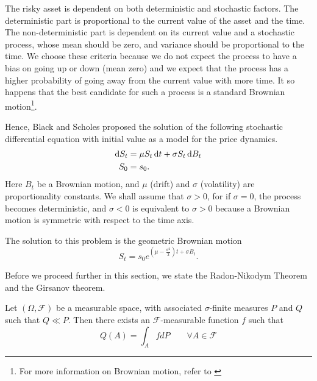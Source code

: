 The risky asset is dependent on both deterministic and stochastic factors. The deterministic part is proportional to the current value of the asset and the time. The non-deterministic part is dependent on its current value and a stochastic process, whose mean should be zero, and variance should be proportional to the time. We choose these criteria because we do not expect the process to have a bias on going up or down (mean zero) and we expect that the process has a higher probability of going away from the current value with more time. It so happens that the best candidate for such a process is a standard Brownian motion\footnote{For more information on Brownian motion, refer to \cite[Section 3.1]{Lamberton1996}}.

Hence, Black and Scholes proposed the solution of the following stochastic differential equation with initial value as a model for the price dynamics.
\begin{subequations}
	\label{eq:continous-risky-sde}
	\begin{align}
		\dif S_t  &=  \mu S_t \dif t + \sigma S_t \dif B_t \\
		S_0  &=  s_0 .
	\end{align}
\end{subequations}
Here $ B_t $ be a Brownian motion, and $ \mu $ (drift) and $ \sigma $ (volatility) are proportionality constants. We shall assume that $ \sigma > 0 $, for if $ \sigma = 0 $, the process becomes deterministic, and $ \sigma < 0 $ is equivalent to $ \sigma > 0 $ because a Brownian motion is symmetric with respect to the time axis.

The solution to this problem is the geometric Brownian motion
\begin{equation}
\label{eq:continous-risky-int}
S_t = s_0 e^{ ( \mu - \frac{\sigma^2}{2} )t + \sigma B_t }.
\end{equation}


Before we proceed further in this section, we state the Radon-Nikodym Theorem and the Girsanov theorem.

\begin{thm}
	\label{thm:radon-nikodym}
	Let $ (\Omega, \mathcal{F}) $ be a measurable space, with associated $ \sigma $-finite measures $ P $ and $ Q $ such that $ Q \ll P $. Then there exists an $ \mathcal{F} $-measurable function $ f $ such that
	\begin{equation*}
	Q(A) = \int_{A} f dP  \qquad  \forall A \in \mathcal{F}
	\end{equation*}
\end{thm}

